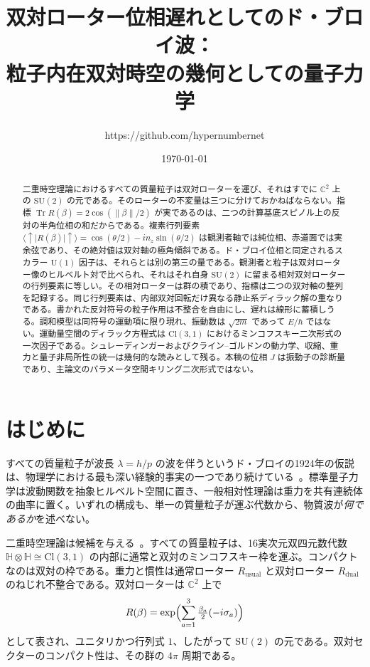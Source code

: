 \documentclass[a4paper]{article}
\title{双対ローター位相遅れとしてのド・ブロイ波：\\
粒子内在双対時空の幾何としての量子力学}
\author{https://github.com/hypernumbernet}
\date{\today}
\begin{document}
\maketitle

\begin{abstract}
二重時空理論におけるすべての質量粒子は双対ローターを運び、それはすでに \(\mathbb{C}^2\) 上の \(\mathrm{SU}(2)\) の元である。そのローターの不変量は三つに分けておかねばならない。指標 \(\operatorname{Tr} R(\beta)=2\cos(\lVert\beta\rVert/2)\) が実であるのは、二つの計算基底スピノル上の反対の半角位相の和だからである。複素行列要素 \(\langle\uparrow\rvert R(\beta)\lvert\uparrow\rangle=\cos(\theta/2)-i n_z\sin(\theta/2)\) は観測者軸では純位相、赤道面では実余弦であり、その絶対値は双対軸の極角傾斜である。ド・ブロイ位相と同定されるスカラー \(\mathrm{U}(1)\) 因子は、それらとは別の第三の量である。観測者と粒子は双対ローター像のヒルベルト対で比べられ、それはそれ自身 \(\mathrm{SU}(2)\) に留まる相対双対ローターの行列要素に等しい。その相対ローターは群の積であり、指標は二つの双対軸の整列を記録する。同じ行列要素は、内部双対回転だけ異なる静止系ディラック解の重なりである。書かれた反対符号の粒子作用は不整合を自由にし、遅れは線形に蓄積しうる。調和模型は同符号の運動項に限り現れ、振動数は \(\sqrt{2m}\) であって \(E/\hbar\) ではない。運動量空間のディラック方程式は \(\mathrm{Cl}(3,1)\) におけるミンコフスキー二次形式の一次因子である。シュレーディンガーおよびクライン–ゴルドンの動力学、収縮、重力と量子非局所性の統一は幾何的な読みとして残る。本稿の位相 \(J\) は振動子の診断量であり、主論文のパラメータ空間キリング二次形式ではない。
\end{abstract}

\section{はじめに}

すべての質量粒子が波長 \(\lambda=h/p\) の波を伴うというド・ブロイの1924年の仮説は、物理学における最も深い経験的事実の一つであり続けている~\cite{debroglie1924}。標準量子力学は波動関数を抽象ヒルベルト空間に置き、一般相対性理論は重力を共有連続体の曲率に置く。いずれの構成も、単一の質量粒子が運ぶ代数から、物質波が\emph{何であるか}を述べない。

二重時空理論は候補を与える~\cite{dst-main}。すべての質量粒子は、16実次元双四元数代数 \(\mathbb{H}\otimes\mathbb{H}\cong\mathrm{Cl}(3,1)\) の内部に通常と双対のミンコフスキー枠を運ぶ。コンパクトなのは双対の枠である。重力と慣性は通常ローター \(R_{\mathrm{usual}}\) と双対ローター \(R_{\mathrm{dual}}\) のねじれ不整合である。双対ローターは \(\mathbb{C}^2\) 上で
\[
R(\beta)=\exp\Bigl(\sum_{a=1}^3\tfrac{\beta_a}{2}(-i\sigma_a)\Bigr)
\]
として表され、ユニタリかつ行列式 \(1\)、したがって \(\mathrm{SU}(2)\) の元である。双対セクターのコンパクト性は、その群の \(4\pi\) 周期である。
\end{document}
